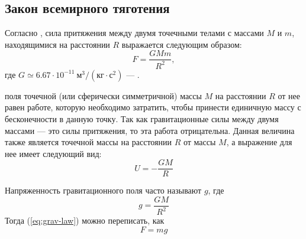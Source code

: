 \subsection{Закон всемирного тяготения}
Согласно , сила притяжения 
между двумя точечными телами с массами $M$ и $m$,
находящимися на расстоянии $R$ выражается следующим
образом:\begin{equation}
	F=\frac{GMm}{R^2}, \label{eq:grav-law}
\end{equation}
где $G\simeq 6.67\cdot 10^{-11}~\text{м}^3 / 
\left( \text{кг} \cdot \text{с}^2 \right)$ --- 
.

 поля точечной (или сферически 
симметричной) массы $M$ на расстоянии $R$ от нее равен
работе, которую необходимо затратить, чтобы принести
единичную массу с бесконечности в данную точку. Так как
гравитационные силы между двумя массами --- это силы 
притяжения, то эта работа отрицательна. Данная
величина также является  точечной
массы на расстоянии $R$ от массы $M$, а выражение для нее имеет 
следующий вид:\begin{equation}
U=-\frac{GM}{R}
\end{equation}

Напряженность гравитационного поля часто называют 
 $g$, где\begin{equation}
	g = \frac{GM}{R^2}
\end{equation}
Тогда (\ref{eq:grav-law}) можно переписать, как \begin{equation}
	F = mg
\end{equation}
